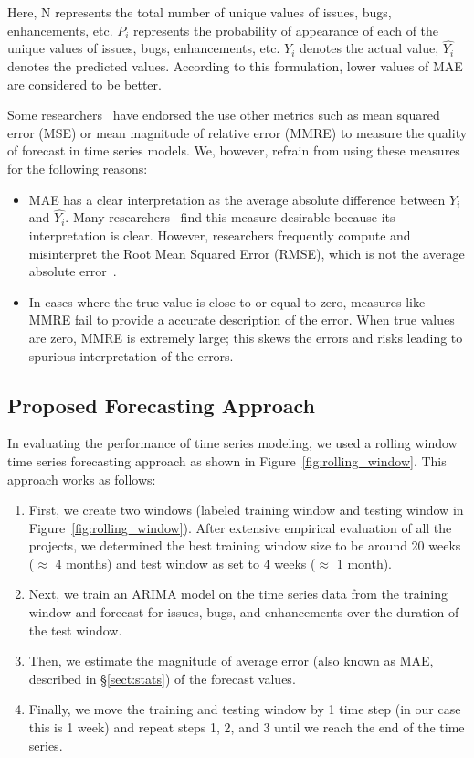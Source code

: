 \documentclass[sigconf, preprint]{acmart}
\newcommand{\bi}{\begin{itemize}}%
\newcommand{\ei}{\end{itemize}}
\newcommand{\be}{\begin{enumerate}}
\newcommand{\ee}{\end{enumerate}}
\newcommand{\tion}[1]{\S\ref{sect:#1}}
\newcommand{\fig}[1]{Figure~\ref{fig:#1}}
\begin{document}
Here, N represents the total number of unique values of issues, bugs, enhancements, etc. $P_i$ represents the probability of appearance of each of the unique values of issues, bugs, enhancements, etc. $Y_i$ denotes the actual value, $\hat{Y_i}$ denotes the predicted values. According to this formulation, lower values of MAE are considered to be better. 

Some researchers~\cite{amin2013approach} have endorsed the use other metrics 
such as mean squared error (MSE) or mean magnitude of relative error (MMRE) to 
measure the quality of forecast in time series models. We, however, refrain 
from using these measures for the following reasons:

\bi
\item MAE has a clear interpretation as the average absolute difference between $Y_i$ and $\hat{Y_i}$. Many researchers~\cite{willmott2005advantages,willmott2006use} find this measure desirable because its interpretation is clear. However, researchers frequently compute and misinterpret the Root Mean Squared Error (RMSE), which is not the average absolute error~\cite{willmott2005advantages,willmott2006use}.
\item In cases where the true value is close to or equal to zero, measures like MMRE fail to provide a accurate description of the error. When true values are zero, MMRE is extremely large; this skews the errors and risks leading to spurious interpretation of the errors. 
\ei



\subsection{Proposed Forecasting Approach}
\label{sect:approach}
In evaluating the performance of time series modeling, we used a rolling 
window time series forecasting approach as shown in \fig{rolling_window}. This 
approach works as follows:
\be
\item First, we create two windows (labeled training window and testing window 
in \fig{rolling_window}). After extensive empirical evaluation of all the 
projects, we determined the best training window size to be around 20 weeks 
($\approx$ 4 months) and test window as set to 4 weeks ($\approx$ 1 month).
\item Next, we train an ARIMA model on the time series data from the training 
window and forecast for issues, bugs, and enhancements over the duration of the 
test window.
\item Then, we estimate the magnitude of average error (also known as MAE, 
described in \tion{stats}) of the forecast values.
\item Finally, we move the training and testing window by 1 time step (in our 
case this is 1 week) and repeat steps 1, 2, and 3 until we reach the end of the 
time series.
\ee
\end{document}
